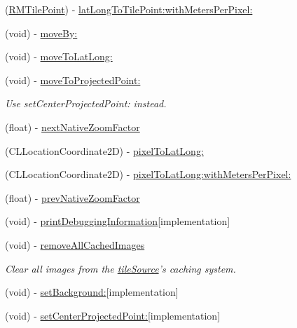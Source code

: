 \begin{DoxyCompactItemize}
\item 
(\hyperlink{struct_r_m_tile_point}{R\-M\-Tile\-Point}) -\/ \hyperlink{interface_r_m_map_contents_af5abbc64cb02512eb4378fce3794f0e1}{lat\-Long\-To\-Tile\-Point\-:with\-Meters\-Per\-Pixel\-:}
\item 
(void) -\/ \hyperlink{interface_r_m_map_contents_af3baee3fc58a0b88ecd7a9ec8c7cbe88}{move\-By\-:}
\item 
(void) -\/ \hyperlink{interface_r_m_map_contents_a6964b2e4a12c17c954d32dc8e8fe739e}{move\-To\-Lat\-Long\-:}
\item 
(void) -\/ \hyperlink{interface_r_m_map_contents_a6bf308257eae65ff4037a4e5654f8c46}{move\-To\-Projected\-Point\-:}
\begin{DoxyCompactList}\small\item\em Use set\-Center\-Projected\-Point\-: instead. \end{DoxyCompactList}\item 
(float) -\/ \hyperlink{interface_r_m_map_contents_a62632c7f86a830a06afbc6f47f8b3fdf}{next\-Native\-Zoom\-Factor}
\item 
(C\-L\-Location\-Coordinate2\-D) -\/ \hyperlink{interface_r_m_map_contents_ad7f1b803be32266a8a0bc5de03fd4e0e}{pixel\-To\-Lat\-Long\-:}
\item 
(C\-L\-Location\-Coordinate2\-D) -\/ \hyperlink{interface_r_m_map_contents_a5fe69ea6a21dac1fdc4c6d136d1a1504}{pixel\-To\-Lat\-Long\-:with\-Meters\-Per\-Pixel\-:}
\item 
(float) -\/ \hyperlink{interface_r_m_map_contents_aef141216ceb8e4c044e83e6ba8a9b7b1}{prev\-Native\-Zoom\-Factor}
\item 
(void) -\/ \hyperlink{interface_r_m_map_contents_a2d6c92fc5d07149961988b7ed062021c}{print\-Debugging\-Information}{\ttfamily  \mbox{[}implementation\mbox{]}}
\item 
(void) -\/ \hyperlink{interface_r_m_map_contents_a05e9ebea304077388c28e5306459ad96}{remove\-All\-Cached\-Images}
\begin{DoxyCompactList}\small\item\em Clear all images from the \hyperlink{interface_r_m_map_contents_afdc2f45aee8bcc5633182450fdea0cfc}{tile\-Source}'s caching system. \end{DoxyCompactList}\item 
(void) -\/ \hyperlink{interface_r_m_map_contents_ac5fb96bc69e7ac42b6a43aff804dc72c}{set\-Background\-:}{\ttfamily  \mbox{[}implementation\mbox{]}}
\item 
(void) -\/ \hyperlink{interface_r_m_map_contents_af156345c10a07045bbedec55efe6247e}{set\-Center\-Projected\-Point\-:}{\ttfamily  \mbox{[}implementation\mbox{]}}

\end{DoxyCompactItemize}

